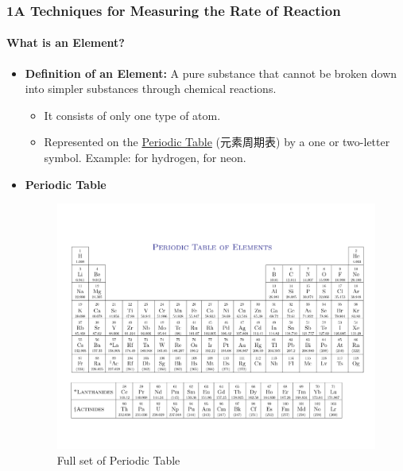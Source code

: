 
\subsubsection{1A Techniques for Measuring the Rate of Reaction}
\paragraph{What is an Element?}
\begin{itemize}
    \item \textbf{Definition of an Element:} A pure substance that cannot be broken down into simpler substances through
    chemical reactions.
    \begin{itemize}
        \item It consists of only one type of atom.
        \item Represented on the \underline{Periodic Table} (元素周期表) by a one or two-letter symbol. Example:  for
        hydrogen,  for neon.
    \end{itemize}
    \item \textbf{Periodic Table}
    \begin{figure}[H]
        \centering
        \includegraphics[scale=0.05]{Chemistry/Images/periodic_table.png}
        \caption{Full set of Periodic Table}
    \end{figure}

\end{itemize}
